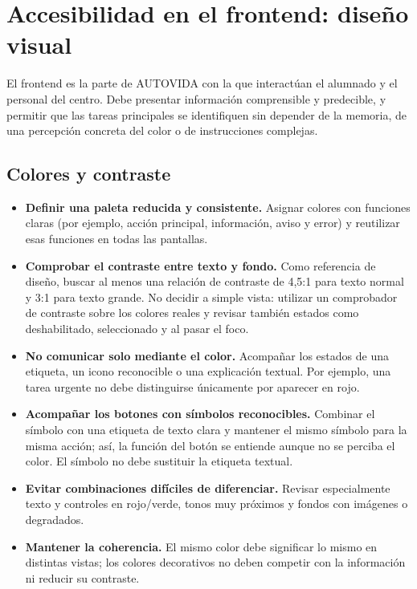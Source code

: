 \section{Accesibilidad en el frontend: diseño visual}

El frontend es la parte de AUTOVIDA con la que interactúan el alumnado y el personal del centro. Debe presentar información comprensible y predecible, y permitir que las tareas principales se identifiquen sin depender de la memoria, de una percepción concreta del color o de instrucciones complejas.

\subsection{Colores y contraste}
\begin{itemize}[leftmargin=*]
  \item \textbf{Definir una paleta reducida y consistente.} Asignar colores con funciones claras (por ejemplo, acción principal, información, aviso y error) y reutilizar esas funciones en todas las pantallas.
  \item \textbf{Comprobar el contraste entre texto y fondo.} Como referencia de diseño, buscar al menos una relación de contraste de 4,5:1 para texto normal y 3:1 para texto grande. No decidir a simple vista: utilizar un comprobador de contraste sobre los colores reales y revisar también estados como deshabilitado, seleccionado y al pasar el foco.
  \item \textbf{No comunicar solo mediante el color.} Acompañar los estados de una etiqueta, un icono reconocible o una explicación textual. Por ejemplo, una tarea urgente no debe distinguirse únicamente por aparecer en rojo.
  \item \textbf{Acompañar los botones con símbolos reconocibles.} Combinar el símbolo con una etiqueta de texto clara y mantener el mismo símbolo para la misma acción; así, la función del botón se entiende aunque no se perciba el color. El símbolo no debe sustituir la etiqueta textual.
  \item \textbf{Evitar combinaciones difíciles de diferenciar.} Revisar especialmente texto y controles en rojo/verde, tonos muy próximos y fondos con imágenes o degradados.
  \item \textbf{Mantener la coherencia.} El mismo color debe significar lo mismo en distintas vistas; los colores decorativos no deben competir con la información ni reducir su contraste.
\end{itemize}

